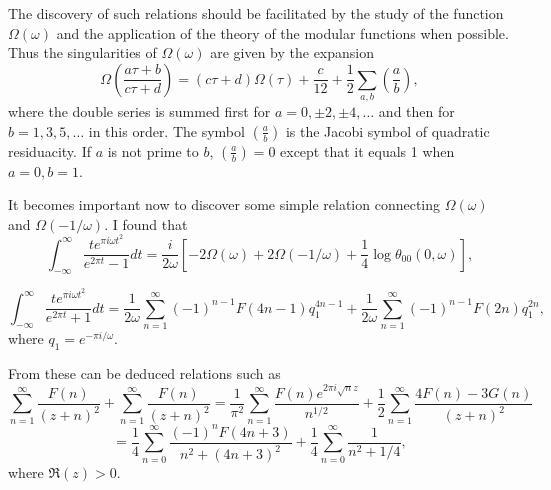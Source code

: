 \documentclass[12pt]{article}
\theoremstyle{remark}
\begin{document}
The discovery of such relations should be facilitated by the study of the function $\Omega(\omega)$ and the application of the theory of the modular functions when possible. Thus the singularities of $\Omega(\omega)$ are given by the expansion~\cite{Mordell1920}
\begin{equation}\label{eq:omega_expansion}
\Omega\left(\frac{a\tau + b}{c\tau + d}\right) = (c\tau + d) \Omega(\tau) + \frac{c}{12} + \frac{1}{2} \sum_{a,b} \left(\frac{a}{b}\right),
\end{equation}
where the double series is summed first for $a = 0, \pm 2, \pm 4, \ldots$ and then for $b = 1, 3, 5, \ldots$ in this order. The symbol $\left(\frac{a}{b}\right)$ is the Jacobi symbol of quadratic residuacity. If $a$ is not prime to $b$, $\left(\frac{a}{b}\right) = 0$ except that it equals 1 when $a = 0, b = 1$.

It becomes important now to discover some simple relation connecting $\Omega(\omega)$ and $\Omega(-1/\omega)$. I found that
\begin{equation}\label{eq:omega_relation1}
\int_{-\infty}^\infty \frac{te^{\pi i\omega t^2}}{e^{2\pi t} - 1} dt = \frac{i}{2\omega} \left[-2\Omega(\omega) + 2\Omega(-1/\omega) + \frac{1}{4}\log\theta_{00}(0, \omega)\right],
\end{equation}

\begin{equation}\label{eq:omega_relation2}
\int_{-\infty}^\infty \frac{te^{\pi i\omega t^2}}{e^{2\pi t} + 1} dt = \frac{1}{2\omega} \sum_{n=1}^\infty (-1)^{n-1} F(4n-1) q_1^{4n-1} + \frac{1}{2\omega} \sum_{n=1}^\infty (-1)^{n-1} F(2n) q_1^{2n},
\end{equation}
where $q_1 = e^{-\pi i/\omega}$.

From these can be deduced relations such as
\begin{equation}\label{eq:class_number_sum}
\sum_{n=1}^\infty \frac{F(n)}{(z+n)^2} + \sum_{n=1}^\infty \frac{F(n)}{(z+n)^2} = \frac{1}{\pi^2} \sum_{n=1}^\infty \frac{F(n) e^{2\pi i \sqrt{n} z}}{n^{1/2}} + \frac{1}{2} \sum_{n=1}^\infty \frac{4F(n) - 3G(n)}{(z+n)^2}
\end{equation}
\begin{equation}\label{eq:class_number_sum2}
= \frac{1}{4} \sum_{n=0}^\infty \frac{(-1)^n F(4n+3)}{n^2 + (4n+3)^2} + \frac{1}{4} \sum_{n=0}^\infty \frac{1}{n^2 + 1/4},
\end{equation}
where $\Re(z) > 0$.
\end{document}
